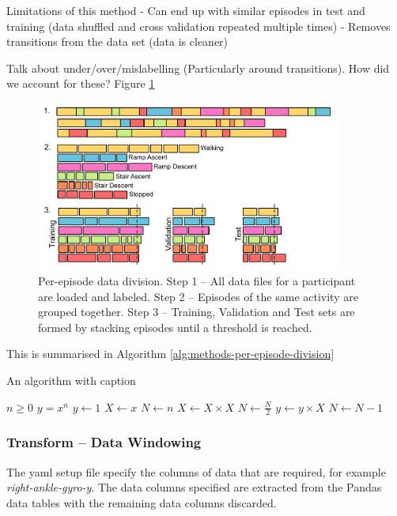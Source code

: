 Limitations of this method
 - Can end up with similar episodes in test and training (data shuffled and cross validation repeated multiple times)
 - Removes transitions from the data set (data is cleaner)
 
 Talk about under/over/mislabelling (Particularly around transitions). How did we account for these? Figure \ref{fig:methods-per-episode-data-division}
 
 \begin{figure}[!hbt]
     \centering
     \includegraphics[width=0.9\textwidth]{content/3-Methods/Episode_Division.pdf}
     \caption[Per-episode data division]{Per-episode data division. Step 1 -- All data files for a participant are loaded and labeled. Step 2 -- Episodes of the same activity are grouped together. Step 3 -- Training, Validation and Test sets are formed by stacking episodes until a threshold is reached.}
     \label{fig:methods-per-episode-data-division}
 \end{figure}
 
 This is summarised in Algorithm \ref{alg:methods-per-episode-division}
\begin{algorithm}
\caption{An algorithm with caption}
\label{alg:methods-per-episode-division}
\begin{algorithmic}
\Require $n \geq 0$
\Ensure $y = x^n$
\State $y \gets 1$
\State $X \gets x$
\State $N \gets n$
    \State $X \gets X \times X$
    \State $N \gets \frac{N}{2}$  
    \State $y \gets y \times X$
    \State $N \gets N - 1$
\EndIf
\EndWhile
\end{algorithmic}
\end{algorithm}
 
\subsubsection{Transform -- Data Windowing}
The \acrshort{yaml} setup file specify the columns of data that are required, for example \textit{right-ankle-gyro-y}. The data columns specified are extracted from the Pandas data tables with the remaining data columns discarded.

